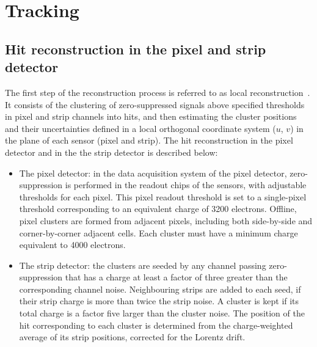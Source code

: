\section{Tracking}
\subsection*{Hit reconstruction in the pixel and strip detector}
The first step of the reconstruction process is referred to as local reconstruction~\cite{Chatrchyan:2014fea}.  It consists of the clustering of zero-suppressed
signals above specified thresholds in pixel and strip channels into hits,  and then estimating the cluster positions and their uncertainties defined in a local
orthogonal  coordinate  system ($u$, $v$) in  the  plane  of  each  sensor (pixel and strip). 
The  hit reconstruction in the pixel detector and in the the strip detector is described below:
\begin{itemize} 
\item The pixel detector: in the data acquisition system of the pixel detector, zero-suppression is performed in the
readout chips of the sensors, with adjustable thresholds for each pixel.  This pixel readout threshold 
is set to a single-pixel threshold corresponding to an equivalent charge of 3200
electrons.  Offline, pixel clusters are formed from adjacent pixels, including both side-by-side
and corner-by-corner adjacent cells.  Each cluster must have a minimum charge equivalent to
4000 electrons.
\item The strip detector:  the clusters are seeded by any channel passing zero-suppression that has a charge at least a
factor of three greater than the corresponding channel noise. Neighbouring strips are added
to each seed, if their strip charge is more than twice the strip noise. 
A cluster is kept if its total charge is a factor five larger than the cluster noise.
The position of the hit corresponding to each cluster is determined from the charge-weighted
average of its strip positions, corrected for the  Lorentz drift.
\end{itemize}

